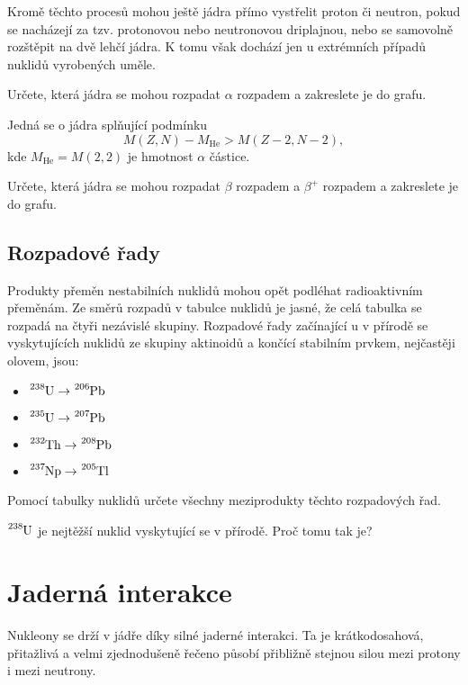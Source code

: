 \documentclass[a4paper,12pt,oneside]{article}
\theoremstyle{red}
\begin{document}
    Kromě těchto procesů mohou ještě jádra přímo vystřelit proton či neutron, pokud se nacházejí za tzv. protonovou nebo neutronovou driplajnou, nebo se samovolně rozštěpit na dvě lehčí jádra.
    K tomu však dochází jen u extrémních případů nuklidů vyrobených uměle.

    \begin{task}
        Určete, která jádra se mohou rozpadat $\alpha$ rozpadem a zakreslete je do grafu.
    \end{task}
    Jedná se o jádra splňující podmínku
    \begin{equation}
        M(Z, N)-M_{\mathrm{He}}>M(Z-2,N-2),
    \end{equation}
    kde $M_{\mathrm{He}}=M(2,2)$ je hmotnost $\alpha$ částice.

    \begin{task}
        Určete, která jádra se mohou rozpadat $\beta$ rozpadem a $\beta^{+}$ rozpadem a zakreslete je do grafu.
    \end{task}
    
\subsection{Rozpadové řady}
    Produkty přeměn nestabilních nuklidů mohou opět podléhat radioaktivním přeměnám.
    Ze směrů rozpadů v tabulce nuklidů je jasné, že celá tabulka se rozpadá na čtyři nezávislé skupiny.
    Rozpadové řady začínající u v přírodě se vyskytujících nuklidů ze skupiny aktinoidů a končící stabilním prvkem, nejčastěji olovem, jsou:
    \begin{itemize}
        \item $\ce{^{238}U}\rightarrow\ce{^{206}Pb}$
        \item $\ce{^{235}U}\rightarrow\ce{^{207}Pb}$
        \item $\ce{^{232}Th}\rightarrow\ce{^{208}Pb}$
        \item $\ce{^{237}Np}\rightarrow\ce{^{205}Tl}$
    \end{itemize}
    \begin{task}
        Pomocí tabulky nuklidů určete všechny meziprodukty těchto rozpadových řad.
    \end{task}

    \begin{task}
        $\ce{^{238}U}$ je nejtěžší nuklid vyskytující se v přírodě.
        Proč tomu tak je?
    \end{task}

\section{Jaderná interakce}
    Nukleony se drží v jádře díky silné jaderné interakci. 
    Ta je krátkodosahová, přitažlivá a velmi zjednodušeně řečeno působí přibližně stejnou silou mezi protony i mezi neutrony.
    
\end{document}
